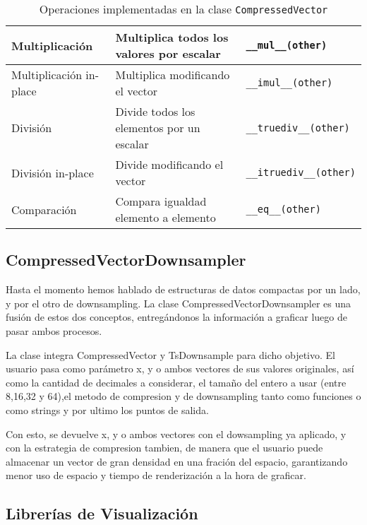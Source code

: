 \begin{table}[H]
\begin{tabular}{|p{3.5cm}|p{6cm}|p{5cm}|}
\hline
\rule{0pt}{1.5em}Multiplicación     & Multiplica todos los valores por escalar       & \texttt{\_\_mul\_\_(other)} \\
\hline
\rule{0pt}{1.5em}Multiplicación in-place & Multiplica modificando el vector         & \texttt{\_\_imul\_\_(other)} \\
\hline
\rule{0pt}{1.5em}División           & Divide todos los elementos por un escalar      & \texttt{\_\_truediv\_\_(other)} \\
\hline
\rule{0pt}{1.5em}División in-place  & Divide modificando el vector                   & \texttt{\_\_itruediv\_\_(other)} \\
\hline
\rule{0pt}{1.5em}Comparación        & Compara igualdad elemento a elemento           & \texttt{\_\_eq\_\_(other)} \\
\hline
\end{tabular}
\caption{Operaciones implementadas en la clase \texttt{CompressedVector}}
\end{table}

\subsection{CompressedVectorDownsampler}

Hasta el momento hemos hablado de estructuras de datos compactas por un lado, y por el otro de downsampling. La clase CompressedVectorDownsampler es una fusión de estos dos conceptos, entregándonos la información a graficar luego de pasar ambos procesos.

La clase integra CompressedVector y TsDownsample para dicho objetivo. El usuario pasa como parámetro x, y o ambos vectores de sus valores originales, así como la cantidad de decimales a considerar, el tamaño del entero a usar (entre 8,16,32 y 64),el metodo de compresion y de downsampling tanto como funciones o como strings y por ultimo los puntos de salida.

Con esto, se devuelve x, y o ambos vectores con el dowsampling ya aplicado, y con la estrategia de compresion tambien, de manera que el usuario puede almacenar un vector de gran densidad en una fración del espacio, garantizando menor uso de espacio y tiempo de renderización a la hora de graficar.


\subsection{Librerías de Visualización}

